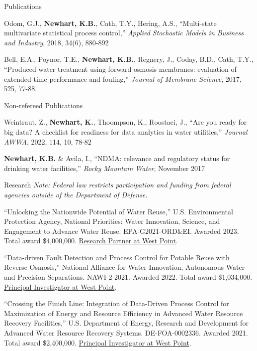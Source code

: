 \documentclass{resume} %
\begin{document}
\begin{rSection}{Publications}
\begin{etaremune}
	\item Odom, G.J., \textbf{Newhart, K.B.}, Cath, T.Y., Hering, A.S., ``Multi-state multivariate statistical process control,'' \emph{Applied Stochastic Models in Business and Industry}, 2018, 34(6), 880-892

	\item Bell, E.A., Poynor, T.E., \textbf{Newhart, K.B.}, Regnery, J., Coday, B.D., Cath, T.Y., ``Produced water treatment using forward osmosis membranes: evaluation of extended-time performance and fouling,'' \emph{Journal of Membrane Science}, 2017, 525, 77-88.
\end{etaremune}

\end{rSection}


\begin{rSection}{Non-refereed Publications}

Weintraut, Z., \textbf{Newhart, K.}, Thoompson, K., Roostaei, J., ``Are you ready for big data? A checklist for readiness for data analytics in water utilities,'' \emph{Journal AWWA}, 2022, 114, 10, 78-82

\textbf{Newhart, K.B.} \& Avila, I., ``NDMA: relevance and regulatory status for drinking water facilities,'' \emph{Rocky Mountain Water}, November 2017

\end{rSection}


\begin{rSection}{Research}
\emph{Note: Federal law restricts participation and funding from federal agencies outside of the Department of Defense.}

``Unlocking the Nationwide Potential of Water Reuse,'' U.S. Environmental Protection Agency, National Priorities: Water Innovation, Science, and Engagement to Advance Water Reuse. EPA-G2021-ORD\&EI. Awarded 2023. Total award \$4,000,000. \ul{Research Partner at West Point}.

``Data-driven Fault Detection and Process Control for Potable Reuse with Reverse Osmosis,'' National Alliance for Water Innovation, Autonomous Water and Precision Separations. NAWI-2-2021. Awarded 2022. Total award \$1,034,000. \ul{Principal Investigator at West Point}.

``Crossing the Finish Line: Integration of Data-Driven Process Control for Maximization of Energy and Resource Efficiency in Advanced Water Resource Recovery Facilities,'' U.S. Department of Energy, Research and Development for Advanced Water Resource Recovery Systems. DE-FOA-0002336. Awarded 2021. Total award \$2,400,000. \ul{Principal Investigator at West Point}.
\end{rSection}
\end{document}
